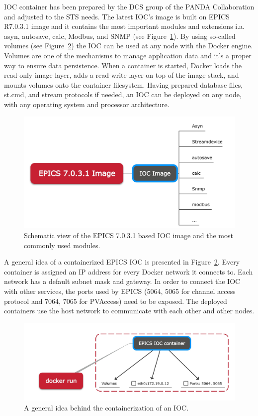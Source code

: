 IOC container has been prepared by the \gls{DCS} group of the \gls{PANDA} Collaboration and adjusted to the \gls{STS} needs. The latest \gls{IOC}'s image is built on EPICS R7.0.3.1 image and it contains the most important modules and extensions i.a. asyn, autosave, calc, Modbus, and SNMP (see Figure~\ref{fig_ioc1}). By using so-called volumes (see Figure~\ref{fig_doc}) the \gls{IOC} can be used at any node with the Docker engine. Volumes are one of the mechanisms to manage application data and it's a proper way to ensure data persistence. When a container is started, Docker loads the read-only image layer, adds a read-write layer on top of the image stack, and mounts volumes onto the container filesystem. Having prepared database files, st.cmd, and stream protocols if needed, an \gls{IOC} can be deployed on any node, with any operating system and processor architecture.
\begin{figure}[!h]
\centering
\includegraphics[width=0.7\columnwidth]{Chapter4/images/epics_ioc.jpg}
\caption{Schematic view of the EPICS 7.0.3.1 based \gls{IOC} image and the most commonly used modules.}
\label{fig_ioc1}
\end{figure}
\newpage
A general idea of a containerized \gls{EPICS} \gls{IOC} is presented in Figure~\ref{fig_doc}. Every container is assigned an IP address for every Docker network it connects to. Each network has a default subnet mask and gateway. In order to connect the \gls{IOC} with other services, the ports used by \gls{EPICS} (5064, 5065 for channel access protocol and 7064, 7065 for PVAccess) need to be exposed.  The deployed containers use the host network to communicate with each other and other nodes.
\begin{figure}[!h]
\centering
\includegraphics[width=0.75\columnwidth]{Chapter4/images/docker_run.jpg}
\caption{A general idea behind the containerization of an \gls{IOC}.}
\label{fig_doc}
\end{figure}
